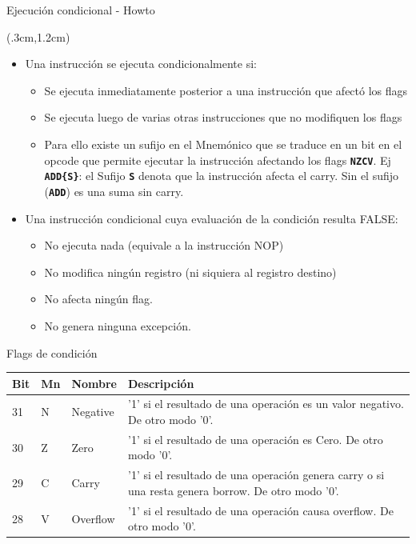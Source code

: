 \documentclass[usenames,table,dvipsnames,aspectratio=169]{beamer}
\begin{document}
\begin{frame}{Ejecución condicional - Howto}
 \begin{textblock*}{\textwidth}(.3cm,1.2cm) 
  \begin{itemize}[<+(1)->]\justifying \parskip .2cm
  \item Una instrucción se ejecuta condicionalmente si:
  \begin{itemize}\justifying\parskip .2cm
   \item [-] Se ejecuta inmediatamente posterior a una instrucción que afectó los flags
   \item [-] Se ejecuta luego de varias otras instrucciones que no modifiquen los flags
   \item [-] Para ello existe un sufijo en el Mnemónico que se traduce en un bit en el opcode que permite ejecutar la instrucción afectando los flags \textbf{\texttt{NZCV}}. Ej \textbf{\texttt{ADD\{S\}}}: el Sufijo \textbf{\texttt{S}} denota que la instrucción afecta el carry. Sin el sufijo (\textbf{\texttt{ADD}}) es una suma sin carry.
  \end{itemize}
  \item Una instrucción condicional cuya evaluación de la condición resulta FALSE:
  \begin{itemize}\justifying\parskip .2cm
   \item [-] No ejecuta nada (equivale a la instrucción NOP)
   \item [-] No modifica ningún registro (ni siquiera al registro destino)
   \item [-] No afecta ningún flag. 
   \item [-] No genera ninguna excepción.
  \end{itemize}  
 \end{itemize}
\end{textblock*}
\end{frame}

\begin{frame}{Flags de condición}
 \begin{block}{}
\begin{center}
\begin{tabular}{|l|l|l|m{8cm}}
 Bit& Mn  & Nombre & Descripción\\
 \hline
 31 & N & Negative & '1' si el resultado de una operación es un valor negativo. De otro modo '0'.\\ 
 \hline
 30 & Z & Zero & '1' si el resultado de una operación es Cero. De otro modo '0'.\\ 
 \hline
 29 & C & Carry & '1' si el resultado de una operación genera carry o si una resta genera borrow. De otro modo '0'.\\ 
 \hline
 28 & V & Overflow & '1' si el resultado de una operación causa overflow. De otro modo '0'.\\ 
\end{tabular}
\end{center}
 \end{block}
\end{frame}
\end{document}
